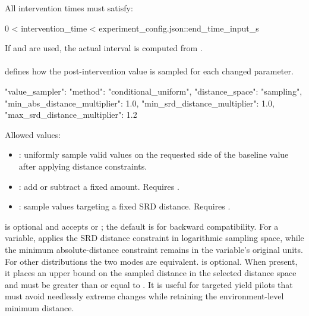 \documentclass[11pt]{article}
\begin{document}
All intervention times must satisfy:

\begin{DocCode}
0 < intervention_time < experiment_config.json::end_time_input_s
\end{DocCode}

If  and  are used, the actual interval is computed from .

\paragraph{\texorpdfstring{}{value\_sampler}}

 defines how the post-intervention value is sampled for each changed parameter.

\begin{DocCode}
"value_sampler": {
  "method": "conditional_uniform",
  "distance_space": "sampling",
  "min_abs_distance_multiplier": 1.0,
  "min_srd_distance_multiplier": 1.0,
  "max_srd_distance_multiplier": 1.2
}
\end{DocCode}

Allowed  values:

\begin{itemize}
\item {}: uniformly sample valid values on the requested side of the baseline value after applying distance constraints.
\item {}: add or subtract a fixed amount. Requires .
\item {}: sample values targeting a fixed SRD distance. Requires .
\end{itemize}

 is optional and accepts  or ; the default is  for backward compatibility.
For a  variable,  applies the SRD distance constraint in logarithmic sampling space, while the minimum absolute-distance constraint remains in the variable's original units.
For other distributions the two modes are equivalent.
 is optional.  When present, it places an
upper bound on the sampled distance in the selected distance space and must be
greater than or equal to .  It is useful for
targeted yield pilots that must avoid needlessly extreme changes while retaining
the environment-level minimum distance.
\end{document}
